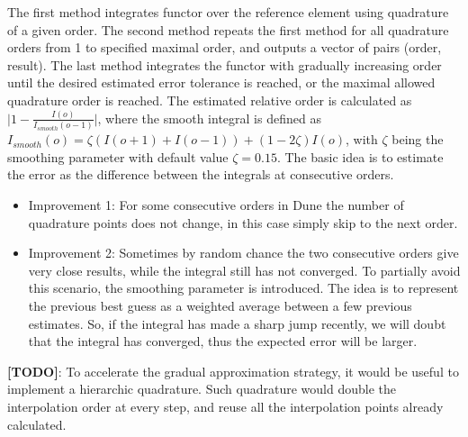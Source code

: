 \noindent
The first method integrates functor over the reference element using quadrature of a given order. The second method repeats the first method for all quadrature orders from 1 to specified maximal order, and outputs a vector of pairs (order, result). The last method integrates the functor with gradually increasing order until the desired estimated error tolerance is reached, or the maximal allowed quadrature order is reached. The estimated relative order is calculated as $\bigl | 1 - \frac{I(o)}{I_{smooth}(o-1)}  \bigr |$, where the smooth integral is defined as $I_{smooth}(o) = \zeta (I(o+1) + I(o-1)) + (1 - 2\zeta)I(o)$, with $\zeta$ being the smoothing parameter with default value $\zeta = 0.15$. The basic idea is to estimate the error as the difference between the integrals at consecutive orders.
\begin{itemize}
	\item Improvement 1: For some consecutive orders in Dune the number of quadrature points does not change, in this case simply skip to the next order.
	\item Improvement 2: Sometimes by random chance the two consecutive orders give very close results, while the integral still has not converged. To partially avoid this scenario, the smoothing parameter is introduced. The idea is to represent the previous best guess as a weighted average between a few previous estimates. So, if the integral has made a sharp jump recently, we will doubt that the integral has converged, thus the expected error will be larger.
\end{itemize}

\textbf{[TODO]}: To accelerate the gradual approximation strategy, it would be useful to implement a hierarchic quadrature. Such quadrature would double the interpolation order at every step, and reuse all the interpolation points already calculated.

